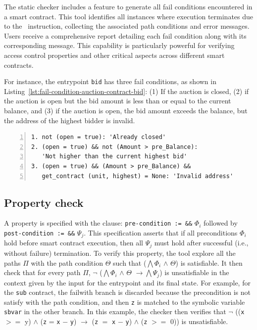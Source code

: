\documentclass[runningheads]{llncs}
\begin{document}
The static checker includes a feature to generate all fail conditions encountered in a smart contract. This tool identifies all instances where execution terminates due to the \FAILWITH\ instruction, collecting the associated path conditions and error messages. Users receive a comprehensive report detailing each fail condition along with its corresponding message. This capability is particularly powerful for verifying access control properties and other critical aspects across different smart contracts.

For instance, the entrypoint \lstinline|bid| has three fail conditions, as shown in Listing~\ref{lst:fail-condition-auction-contract-bid}: (1) If the auction is closed, (2) if the auction is open but the bid amount is less than or equal to the current balance, and (3) if the auction is open, the bid amount exceeds the balance, but the address of the highest bidder is invalid.



\begin{lstlisting}[float=tp,captionpos=b,caption={Fail condition for auction contract bid entrypoint },label={lst:fail-condition-auction-contract-bid},numbers=left]
1. not (open = true): 'Already closed'
2. (open = true) && not (Amount > pre_Balance):
   'Not higher than the current highest bid'
3. (open = true) && (Amount > pre_Balance) && 
   get_contract (unit, highest) = None: 'Invalid address' 
\end{lstlisting}
\subsection{Property check}
\label{sec:property-check}
A property is
specified with the clause:  \lstinline/pre-condition := &&/
$\Phi_{i}$ followed by \lstinline/post-condition := &&/ $\Psi_{j}$. This
specification asserts that if all preconditions $\Phi_{i}$ hold before
smart contract execution, then all $\Psi_{j}$ must hold after
successful (i.e., without failure) termination. To verify this
property, the tool explore all the paths $\Pi$ 
with the path condition $\Theta$ such that ($\bigwedge \Phi_{i}$
$\land$ $\Theta$) is satisfiable. It then check that for every path
$\Pi$, $\neg$ ($\bigwedge \Phi_{i}$ $\land$ $\Theta$ $\rightarrow \bigwedge \Psi_{j}$) is unsatisfiable in the context given by the input for the entrypoint
and its final state. For example, for the \lstinline/sub/ contract, the failwith branch is discarded because the precondition is not satisfy with the path condition, and then \lstinline/z/ is matched to
the symbolic variable \lstinline/sbvar/ in the other branch. In this
example, the checker then verifies that $\neg$ ((\lstinline/x/ $>=$ y) $\land$ (\lstinline/z/
= \lstinline/x/ $-$ \lstinline/y/) $\rightarrow$ (\lstinline/z/ $=$ \lstinline/x/ $-$ \lstinline/y/) $\land$ (\lstinline/z/ $>=$ 0)) is unsatisfiable.
\end{document}

